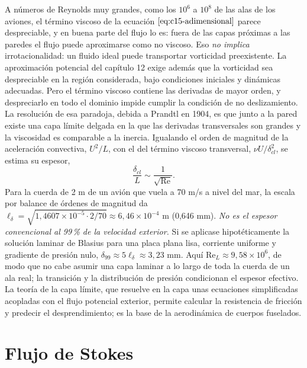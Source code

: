 \documentclass[10pt,openany]{book}
\begin{document}
A números de Reynolds muy grandes, como los \(10^{6}\) a \(10^{8}\) de las alas de los aviones, el término viscoso de la ecuación \(\eqref{eq:c15-adimensional}\) parece despreciable, y en buena parte del flujo lo es: fuera de las capas próximas a las paredes el flujo puede aproximarse como no viscoso. Eso \emph{no implica} irrotacionalidad: un fluido ideal puede transportar vorticidad preexistente. La aproximación potencial del capítulo 12 exige además que la vorticidad sea despreciable en la región considerada, bajo condiciones iniciales y dinámicas adecuadas. Pero el término viscoso contiene las derivadas de mayor orden, y despreciarlo en todo el dominio impide cumplir la condición de no deslizamiento. La resolución de esa paradoja, debida a Prandtl en 1904, es que junto a la pared existe una capa límite delgada en la que las derivadas transversales son grandes y la viscosidad es comparable a la inercia. Igualando el orden de magnitud de la aceleración convectiva, \(U^{2}/L\), con el del término viscoso transversal, \(\nu U/\delta_{cl}^{2}\), se estima su espesor,
\begin{equation}
\frac{\delta_{cl}}{L} \sim \frac{1}{\sqrt{\mathrm{Re}}}. \label{eq:c15-capa-limite}
\end{equation}
Para la cuerda de 2 m de un avión que vuela a 70 m/s a nivel del mar, la escala por balance de órdenes de magnitud da \(\ell_\delta=\sqrt{1{,}4607\times 10^{-5}\cdot 2/70}\approx6{,}46\times10^{-4}\) m (0,646 mm). \emph{No es el espesor convencional al 99\,\% de la velocidad exterior.} Si se aplicase hipotéticamente la solución laminar de Blasius para una placa plana lisa, corriente uniforme y gradiente de presión nulo, \(\delta_{99}\approx5\ell_\delta\approx3{,}23\) mm. Aquí \(\mathrm{Re}_L\approx9{,}58\times10^6\), de modo que no cabe asumir una capa laminar a lo largo de toda la cuerda de un ala real; la transición y la distribución de presión condicionan el espesor efectivo. La teoría de la capa límite, que resuelve en la capa unas ecuaciones simplificadas acopladas con el flujo potencial exterior, permite calcular la resistencia de fricción y predecir el desprendimiento; es la base de la aerodinámica de cuerpos fuselados.

\section{Flujo de Stokes}
\end{document}
